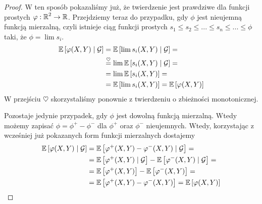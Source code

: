 \begin{proof}
  W ten sposób pokazaliśmy już, że twierdzenie jest prawdziwe dla funkcji prostych $\varphi:\operatorname{\mathbb{R}}^2\to \operatorname{\mathbb{R}}$. Przejdziemy teraz do przypadku, gdy $\phi$ jest nieujemną funkcją mierzalną, czyli istnieje ciąg funkcji prostych $s_1\leq s_2\leq ...\leq s_n\leq...\leq \phi$ taki, że $\phi=\lim s_i$.
  \begin{align*}
    \expected{\phi(X, Y)}{\set{G}}&=\expected{\lim s_i(X, Y)}{\set{G}}=\\ 
                                  &\overset{\heartsuit}{=}\lim\expected{s_i(X, Y)}{\set{G}}=\\ 
                                  &=\lim\expected{s_i(X, Y)}=\\ 
                                  &=\expected{\lim s_i(X, Y)}=\expected{\phi(X, Y)}
  \end{align*}
  W przejściu $\heartsuit$ skorzystaliśmy ponownie z twierdzeniu o zbieżności monotonicznej.

  Pozostaje jedynie przypadek, gdy $\phi$ jest dowolną funkcją mierzalną. Wtedy możemy zapisać $\phi=\phi^+-\phi^-$ dla $\phi^+$ oraz $\phi^-$ nieujemnych. Wtedy, korzystając z wcześniej już pokazanych form funkcji mierzalnych dostajemy
  \begin{align*}
    \expected{\phi(X, Y)}{\set{G}}&=\expected{\phi^+(X, Y)-\phi^-(X, Y)}{\set{G}}=\\ 
                                  &=\expected{\phi^+(X, Y)}{\set{G}}-\expected{\phi^-(X, Y)}{\set{G}}=\\ 
                                  &=\expected{\phi^+(X, Y)}-\expected{\phi^-(X, Y)}=\\ 
                                  &=\expected{\phi^+(X, Y)-\phi^-(X, Y)}=\expected{\phi(X, Y)}
  \end{align*}

\end{proof}
